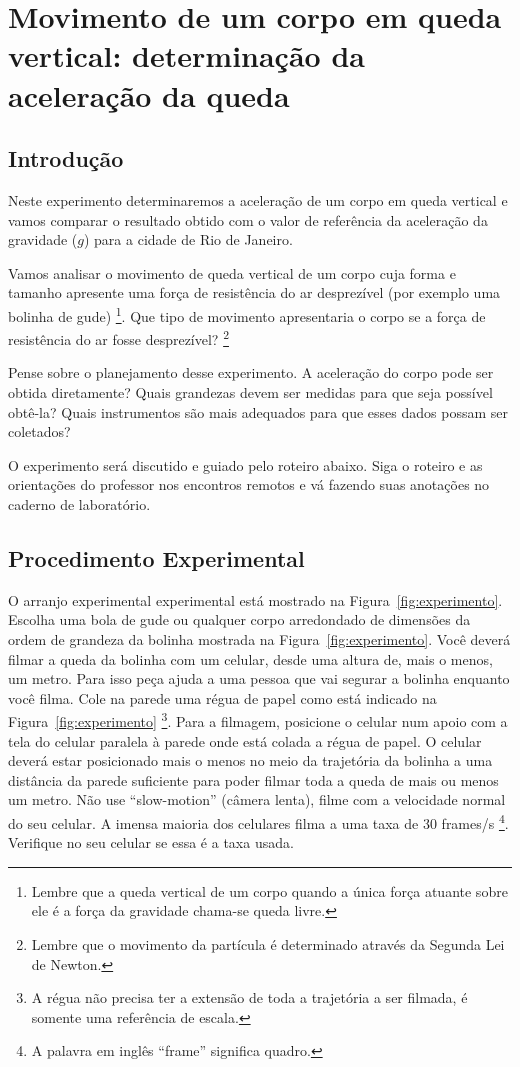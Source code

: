 
\chapter{ Movimento de um corpo em queda vertical: determinação da aceleração da queda}
\label{chap:acelera}


\vspace{-0.7cm}

\section{Introdução}
Neste experimento determinaremos a aceleração de um corpo em queda vertical e vamos 
comparar o resultado obtido com o valor de referência da aceleração da gravidade ($g$)
para a cidade de Rio de Janeiro. 

Vamos analisar o movimento de queda vertical de um corpo cuja forma e tamanho apresente uma força de resistência do ar desprezível (por exemplo uma bolinha de gude) \footnote{Lembre que a queda vertical de um corpo quando a única força atuante sobre ele é a força da gravidade chama-se queda livre.}. Que tipo de movimento 
apresentaria o corpo se a força de resistência do ar fosse desprezível? \footnote{Lembre que o movimento da partícula é determinado através da Segunda Lei de Newton.}

Pense sobre o planejamento desse experimento. A aceleração do corpo pode ser obtida diretamente? Quais grandezas devem ser medidas para que seja possível obtê-la? Quais instrumentos são mais adequados para que esses dados possam ser coletados?

O experimento será discutido e guiado pelo roteiro abaixo. Siga o roteiro e as orientações do professor 
nos encontros remotos e vá fazendo suas anotações no caderno de laboratório. 

\section{Procedimento Experimental}

O arranjo experimental experimental está mostrado na Figura~\ref{fig:experimento}. Escolha uma bola de gude ou qualquer corpo arredondado de dimensões da ordem de grandeza da bolinha mostrada na Figura~\ref{fig:experimento}. Você deverá filmar a queda da bolinha com um celular, desde uma altura de, mais o menos, um metro. Para isso peça ajuda a uma pessoa que vai segurar a bolinha enquanto você filma.  Cole na parede uma régua de papel como está indicado na Figura~\ref{fig:experimento} \footnote {A régua não precisa ter a extensão de toda a trajetória a ser filmada, é somente uma referência de escala.}. Para a filmagem, posicione o celular num apoio com a tela do celular paralela à parede onde está colada a régua de papel. O celular deverá estar posicionado mais o menos no meio da trajetória da bolinha a uma distância da parede suficiente para poder filmar toda a queda de mais ou menos um metro. Não use ``slow-motion'' (câmera lenta),  filme com a velocidade normal do seu celular. A imensa maioria dos celulares filma a uma taxa de 30 frames/s \footnote{A palavra em inglês ``frame'' significa quadro.}. Verifique no seu celular se essa é a taxa usada.

